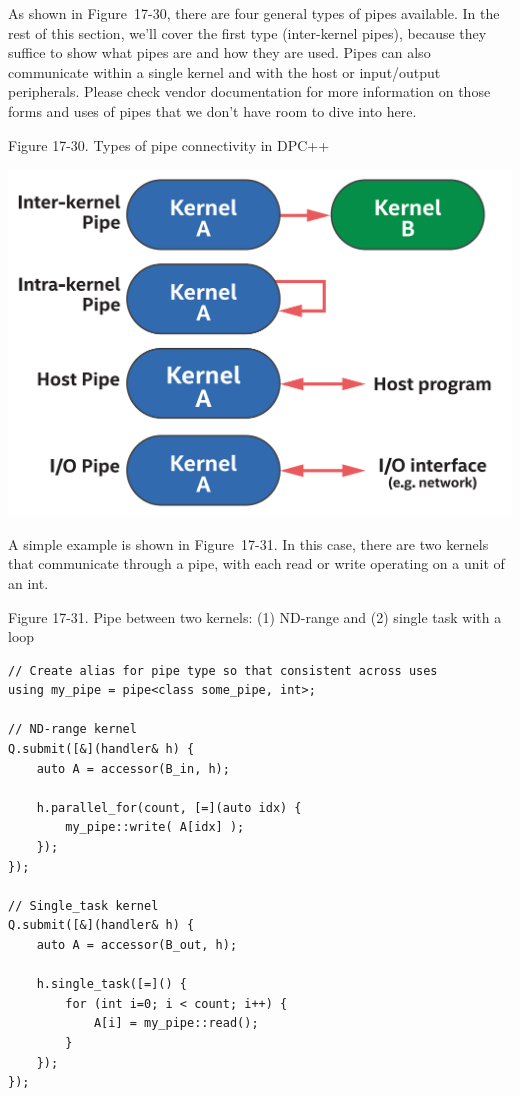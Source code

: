 As shown in Figure 17-30, there are four general types of pipes available. In the rest of this section, we’ll cover the first type (inter-kernel pipes), because they suffice to show what pipes are and how they are used. Pipes can also communicate within a single kernel and with the host or input/output peripherals. Please check vendor documentation for more information on those forms and uses of pipes that we don’t have room to dive into here.\par

\hspace*{\fill} \par %
Figure 17-30. Types of pipe connectivity in DPC++
\begin{center}
	\includegraphics[width=1.0\textwidth]{content/chapter-17/images/25}
\end{center}

A simple example is shown in Figure 17-31. In this case, there are two kernels that communicate through a pipe, with each read or write operating on a unit of an int.\par

\hspace*{\fill} \par %
Figure 17-31. Pipe between two kernels: (1) ND-range and (2) single task with a loop
\begin{lstlisting}[caption={}]
// Create alias for pipe type so that consistent across uses
using my_pipe = pipe<class some_pipe, int>;

// ND-range kernel
Q.submit([&](handler& h) {
	auto A = accessor(B_in, h);
	
	h.parallel_for(count, [=](auto idx) {
		my_pipe::write( A[idx] );
	});
});

// Single_task kernel
Q.submit([&](handler& h) {
	auto A = accessor(B_out, h);
	
	h.single_task([=]() {
		for (int i=0; i < count; i++) {
			A[i] = my_pipe::read();
		}
	});
});
\end{lstlisting}

